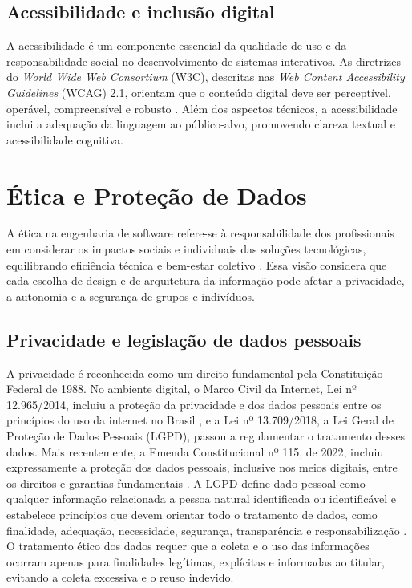         \subsection{Acessibilidade e inclusão digital}

        A acessibilidade é um componente essencial da qualidade de uso e da responsabilidade social no desenvolvimento de sistemas interativos. As diretrizes do \textit{World Wide Web Consortium} (W3C), descritas nas \textit{Web Content Accessibility Guidelines} (WCAG) 2.1, orientam que o conteúdo digital deve ser perceptível, operável, compreensível e robusto \cite{WCAG21}. Além dos aspectos técnicos, a acessibilidade inclui a adequação da linguagem ao público-alvo, promovendo clareza textual e acessibilidade cognitiva.

    \section{Ética e Proteção de Dados}
        \label{sec:etica-dados}

        A ética na engenharia de software refere-se à responsabilidade dos profissionais em considerar os impactos sociais e individuais das soluções tecnológicas, equilibrando eficiência técnica e bem-estar coletivo \cite{floridi2013ethics}. Essa visão considera que cada escolha de design e de arquitetura da informação pode afetar a privacidade, a autonomia e a segurança de grupos e indivíduos.

        \subsection{Privacidade e legislação de dados pessoais}

        A privacidade é reconhecida como um direito fundamental pela Constituição Federal de 1988. No ambiente digital, o Marco Civil da Internet, Lei nº 12.965/2014, incluiu a proteção da privacidade e dos dados pessoais entre os princípios do uso da internet no Brasil \cite{MarcoCivil2014}, e a Lei nº 13.709/2018, a Lei Geral de Proteção de Dados Pessoais (LGPD), passou a regulamentar o tratamento desses dados. Mais recentemente, a Emenda Constitucional nº 115, de 2022, incluiu expressamente a proteção dos dados pessoais, inclusive nos meios digitais, entre os direitos e garantias fundamentais \cite{EC115_2022}. A LGPD define dado pessoal como qualquer informação relacionada a pessoa natural identificada ou identificável e estabelece princípios que devem orientar todo o tratamento de dados, como finalidade, adequação, necessidade, segurança, transparência e responsabilização \cite{LGPD2018}. O tratamento ético dos dados requer que a coleta e o uso das informações ocorram apenas para finalidades legítimas, explícitas e informadas ao titular, evitando a coleta excessiva e o reuso indevido.

